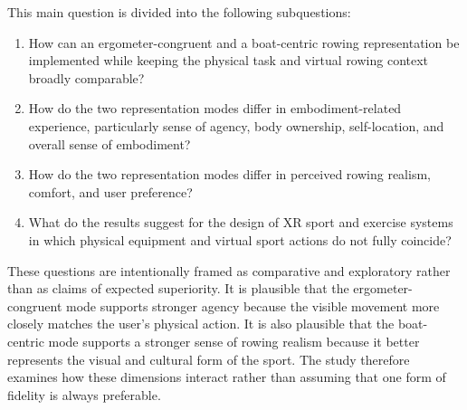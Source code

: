 This main question is divided into the following subquestions:

\begin{enumerate}
    \item How can an ergometer-congruent and a boat-centric rowing representation be implemented while keeping the physical task and virtual rowing context broadly comparable?

    \item How do the two representation modes differ in embodiment-related experience, particularly sense of agency, body ownership, self-location, and overall sense of embodiment?

    \item How do the two representation modes differ in perceived rowing realism, comfort, and user preference?

    \item What do the results suggest for the design of XR sport and exercise systems in which physical equipment and virtual sport actions do not fully coincide?
\end{enumerate}

These questions are intentionally framed as comparative and exploratory rather than as claims of expected superiority. It is plausible that the ergometer-congruent mode supports stronger agency because the visible movement more closely matches the user's physical action. It is also plausible that the boat-centric mode supports a stronger sense of rowing realism because it better represents the visual and cultural form of the sport. The study therefore examines how these dimensions interact rather than assuming that one form of fidelity is always preferable.
